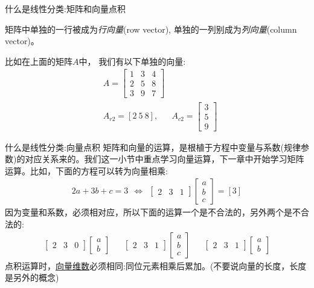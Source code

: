 \documentclass[handout]{ctexbeamer}
\begin{document}
\begin{frame}{什么是线性分类:矩阵和向量点积}
\begin{definition}
	矩阵中单独的一行被成为\textit{行向量}(row vector), 单独的一列别成为\textit{列向量}(column vector)。
\end{definition}
\begin{example}
比如在上面的矩阵$A$中，	我们有以下单独的向量:
\begin{align*}
 & A = \begin{bmatrix}
	1 & 3 & 4 \\
	2 & 5 & 8 \\
	3 & 9 & 7
\end{bmatrix} \\
	& A_{r2} = [2 \ 5 \ 8],   & A_{c2} = \begin{bmatrix}
		3 \\
		5 \\
		9 
	\end{bmatrix}
\end{align*}
\end{example}
\end{frame}

\begin{frame}{什么是线性分类:向量点积}
矩阵和向量的运算，是根植于方程中变量与系数(规律参数)的对应关系来的。我们这一小节中重点学习向量运算，下一章中开始学习矩阵运算。比如，下面的方程可以转为向量相乘:
		\begin{align*}
			2a + 3b + c = 3 \ \ \Leftrightarrow \ \ \begin{bmatrix}
				2 & 3 & 1
			\end{bmatrix} \begin{bmatrix}
				a \\
				b \\
				c
			\end{bmatrix} = [3] 
		\end{align*}
		因为变量和系数，必须相对应，所以下面的运算一个是不合法的，另外两个是不合法的:
		\begin{align*}
			\begin{bmatrix}
				2 & 3 & 0
			\end{bmatrix} \begin{bmatrix}
				a \\
				b 
			\end{bmatrix} & & \begin{bmatrix}
				2 & 3 & 1
			\end{bmatrix} \begin{bmatrix}
				a \\
				b \\
				c
			\end{bmatrix} & & \begin{bmatrix}
				2 & 3 & 1
			\end{bmatrix} \begin{bmatrix}
				a \\
				b 
			\end{bmatrix}
		\end{align*}	
		点积运算时，\underline{向量维数}必须相同:同位元素相乘后累加。(不要说向量的长度，长度是另外的概念)
\end{frame}
\end{document}
